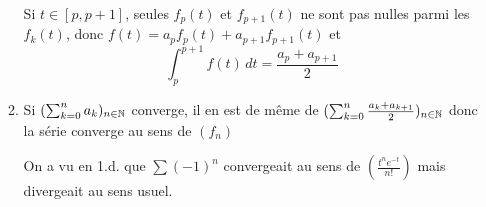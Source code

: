 \begin{enumerate}
\begin{enumerate}
Si $t\in [p,p+1]$, seules $f_{p}(t)$ et $f_{p+1}(t)$ ne sont pas nulles parmi les $f_{k}(t)$, donc $f(t)=a_{p}f_{p}(t)+ a_{p+1}f_{p+1}(t)$ et
$$\int_{p}^{p+1}f(t)\,dt=\frac{a_{p}+a_{p+1}}{2}$$
\item Si $(\sum _{k=0}^{n}a_{k})_{n\in \Bbb{N}}$ converge, il en est de même de $(\sum _{k=0}^{n} \frac{ a_{k}+ a_{k+1}}{2})_{n\in \Bbb{N}}$ donc la série converge au sens de $(f_{n})$

On a vu en 1.d. que $\sum (-1)^{n}$ convergeait au sens de $(\frac{t^{n}e^{-t}}{n!})$ mais divergeait au sens usuel.
\end{enumerate}
\end{enumerate}
